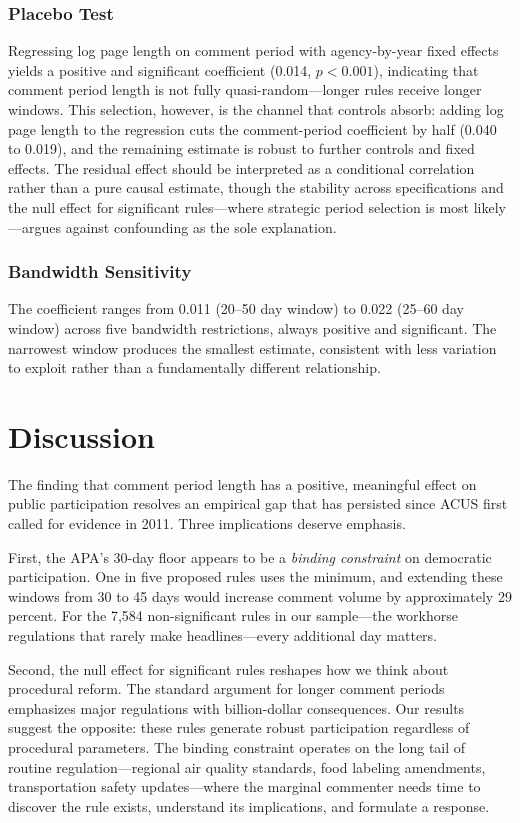 \documentclass[12pt]{article}
\begin{document}
\subsubsection*{Placebo Test} Regressing log page length on comment period with agency-by-year fixed effects yields a positive and significant coefficient (0.014, $p < 0.001$), indicating that comment period length is not fully quasi-random---longer rules receive longer windows. This selection, however, is the channel that controls absorb: adding log page length to the regression cuts the comment-period coefficient by half (0.040 to 0.019), and the remaining estimate is robust to further controls and fixed effects. The residual effect should be interpreted as a conditional correlation rather than a pure causal estimate, though the stability across specifications and the null effect for significant rules---where strategic period selection is most likely---argues against confounding as the sole explanation.

\subsubsection*{Bandwidth Sensitivity} The coefficient ranges from 0.011 (20--50 day window) to 0.022 (25--60 day window) across five bandwidth restrictions, always positive and significant. The narrowest window produces the smallest estimate, consistent with less variation to exploit rather than a fundamentally different relationship.

\section{Discussion}
\label{sec:discussion}

The finding that comment period length has a positive, meaningful effect on public participation resolves an empirical gap that has persisted since ACUS first called for evidence in 2011. Three implications deserve emphasis.

First, the APA's 30-day floor appears to be a \textit{binding constraint} on democratic participation. One in five proposed rules uses the minimum, and extending these windows from 30 to 45 days would increase comment volume by approximately 29 percent. For the 7,584 non-significant rules in our sample---the workhorse regulations that rarely make headlines---every additional day matters.

Second, the null effect for significant rules reshapes how we think about procedural reform. The standard argument for longer comment periods emphasizes major regulations with billion-dollar consequences. Our results suggest the opposite: these rules generate robust participation regardless of procedural parameters. The binding constraint operates on the long tail of routine regulation---regional air quality standards, food labeling amendments, transportation safety updates---where the marginal commenter needs time to discover the rule exists, understand its implications, and formulate a response.
\end{document}
